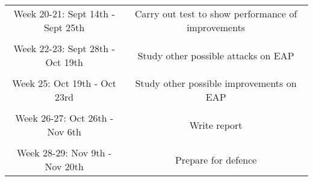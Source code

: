 \documentclass{article}
\begin{document}
\begin{table}[ht]
\begin{tabular}{c c}
\\
Week 20-21: Sept 14th - Sept 25th  & Carry out test to show performance of improvements \\ 
\\
Week 22-23: Sept 28th - Oct 19th &  Study other possible attacks on EAP \\
\\
Week 25: Oct 19th - Oct 23rd & Study other possible improvements on EAP \\
\\
Week 26-27: Oct 26th - Nov 6th & Write report \\
\\
Week 28-29: Nov 9th - Nov 20th  & Prepare for defence \\
\hline
\end{tabular}
\label{table:nonlin}
\end{table}
\clearpage


\end{document}
